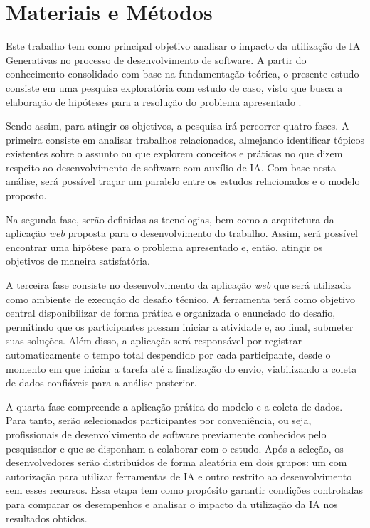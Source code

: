 \documentclass[english,brazilian]{UNISINOSartigo} %
\begin{document}
\section{Materiais e Métodos}

Este trabalho tem como principal objetivo analisar o impacto da utilização de IA Generativas no processo de desenvolvimento de software. A partir do conhecimento consolidado com base na fundamentação teórica, o presente estudo consiste em uma pesquisa exploratória com estudo de caso, visto que busca a elaboração de hipóteses para a resolução do problema apresentado \cite{wazlawick2020}.

Sendo assim, para atingir os objetivos, a pesquisa irá percorrer quatro fases. A primeira consiste em analisar trabalhos relacionados, almejando identificar tópicos existentes sobre o assunto ou que explorem conceitos e práticas no que dizem respeito ao desenvolvimento de software com auxílio de IA. Com base nesta análise, será possível traçar um paralelo entre os estudos relacionados e o modelo proposto.

Na segunda fase, serão definidas as tecnologias, bem como a arquitetura da aplicação \textit{web} proposta para o desenvolvimento do trabalho. Assim, será possível encontrar uma hipótese para o problema apresentado e, então, atingir os objetivos de maneira satisfatória.

A terceira fase consiste no desenvolvimento da aplicação \textit{web} que será utilizada como ambiente de execução do desafio técnico. A ferramenta terá como objetivo central disponibilizar de forma prática e organizada o enunciado do desafio, permitindo que os participantes possam iniciar a atividade e, ao final, submeter suas soluções. Além disso, a aplicação será responsável por registrar automaticamente o tempo total despendido por cada participante, desde o momento em que iniciar a tarefa até a finalização do envio, viabilizando a coleta de dados confiáveis para a análise posterior.

A quarta fase compreende a aplicação prática do modelo e a coleta de dados. Para tanto, serão selecionados participantes por conveniência, ou seja, profissionais de desenvolvimento de software previamente conhecidos pelo pesquisador e que se disponham a colaborar com o estudo. Após a seleção, os desenvolvedores serão distribuídos de forma aleatória em dois grupos: um com autorização para utilizar ferramentas de IA e outro restrito ao desenvolvimento sem esses recursos. Essa etapa tem como propósito garantir condições controladas para comparar os desempenhos e analisar o impacto da utilização da IA nos resultados obtidos.
\end{document}
